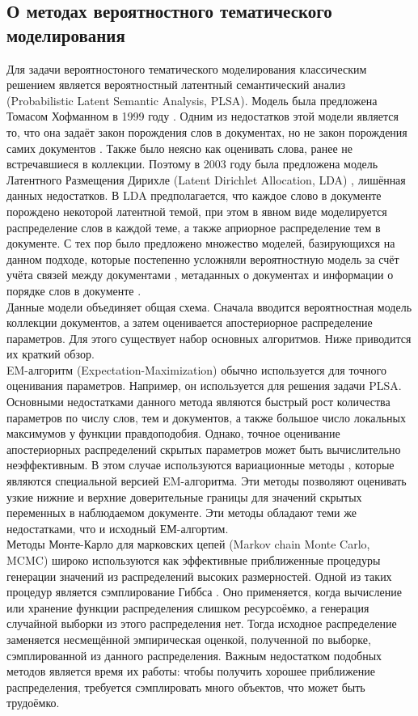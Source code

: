 \documentclass[12pt]{article}
\begin{document}
	\subsection{О методах вероятностного тематического моделирования}
Для  задачи вероятностоного тематического моделирования  классическим решением является вероятностный латентный семантический анализ (Probabilistic Latent Semantic Analysis, PLSA). Модель  была предложена Томасом Хофманном в 1999 году \cite{plsadef2}. Одним из недостатков этой модели является то, что она задаёт закон порождения слов в документах, но не закон порождения самих документов \cite{plsaminus}. Также было неясно как оценивать слова, ранее не встречавшиеся в коллекции. Поэтому в 2003 году была предложена модель Латентного Размещения Дирихле (Latent Dirichlet Allocation, LDA) \cite{ldadef1}, лишённая данных недостатков. В LDA предполагается, что каждое слово в документе порождено некоторой латентной темой, при этом в явном виде моделируется распределение слов в каждой теме, а также априорное
распределение тем в документе. С тех пор было предложено множество моделей, базирующихся на данном подходе, которые постепенно усложняли вероятностную модель за счёт учёта связей между документами \cite{connect1, connect2, connect3}, метаданных о документах \cite{metadata} и информации о порядке слов в документе \cite{order1, order2}.\\
Данные модели объединяет общая схема. Сначала вводится вероятностная модель коллекции документов, а затем оценивается  апостериорное распределение  параметров. Для этого существует набор основных алгоритмов. Ниже приводится их краткий обзор.\\
EM-алгоритм (Expectation-Maximization) \cite{baseem} обычно используется для  точного оценивания параметров. Например, он используется для решения задачи PLSA. Основными недостатками данного метода являются быстрый рост количества параметров по числу слов, тем и документов, а также большое число локальных максимумов у функции правдоподобия. Однако, точное оценивание апостериорных распределений скрытых параметров может быть вычислительно неэффективным. В этом случае используются вариационные методы \cite{basevar}, которые являются специальной версией EM-алгоритма. Эти методы позволяют оценивать узкие нижние и верхние доверительные границы для значений скрытых переменных в наблюдаемом документе. Эти методы обладают теми же недостатками, что и исходный ЕМ-алгортим.\\
Методы Монте-Карло для марковских цепей (Markov chain Monte Carlo, MCMC) \cite{mcmc1, mcmc2} широко используются как эффективные приближенные процедуры генерации значений из распределений высоких размерностей. Одной из таких процедур является сэмплирование Гиббса \cite{gibbs}.  Оно применяется, когда вычисление или хранение функции распределения слишком ресурсоёмко, а генерация случайной выборки из этого распределения нет. Тогда исходное распределение заменяется несмещённой эмпирическая оценкой, полученной по выборке, сэмплированной из данного распределения. Важным недостатком подобных методов является время их работы: чтобы получить хорошее приближение распределения, требуется сэмплировать много объектов, что может быть трудоёмко. \\
\end{document}
